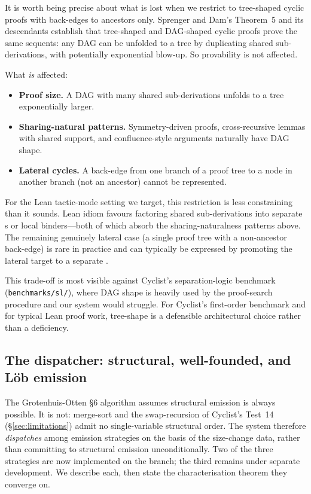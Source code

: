 It is worth being precise about what is lost when we restrict to
tree-shaped cyclic proofs with back-edges to ancestors only. Sprenger and
Dam's Theorem~5 and its descendants establish that tree-shaped and
DAG-shaped cyclic proofs prove the same sequents: any DAG can be unfolded
to a tree by duplicating shared sub-derivations, with potentially
exponential blow-up. So provability is not affected.

What \emph{is} affected:

\begin{itemize}
  \item \textbf{Proof size.} A DAG with many shared sub-derivations
    unfolds to a tree exponentially larger.
  \item \textbf{Sharing-natural patterns.} Symmetry-driven proofs,
    cross-recursive lemmas with shared support, and confluence-style
    arguments naturally have DAG shape.
  \item \textbf{Lateral cycles.} A back-edge from one branch of a
    proof tree to a node in another branch (not an ancestor) cannot be
    represented.
\end{itemize}

For the Lean tactic-mode setting we target, this restriction is less
constraining than it sounds. Lean idiom favours factoring shared
sub-derivations into separate s or local 
binders---both of which absorb the sharing-naturalness patterns above. The
remaining genuinely lateral case (a single proof tree with a non-ancestor
back-edge) is rare in practice and can typically be expressed by promoting
the lateral target to a separate .

This trade-off is most visible against Cyclist's separation-logic
benchmark (\texttt{benchmarks/sl/}), where DAG shape is heavily used by the
proof-search procedure and our system would struggle. For Cyclist's
first-order benchmark and for typical Lean proof work, tree-shape is a
defensible architectural choice rather than a deficiency.

\subsection{The dispatcher: structural, well-founded, and Löb emission}
\label{sec:dispatch}

The Grotenhuis-Otten §6 algorithm assumes structural emission is always
possible. It is not: merge-sort and the swap-recursion of Cyclist's
Test~14 (§\ref{sec:limitations}) admit no single-variable structural
order. The system therefore \emph{dispatches} among emission strategies on
the basis of the size-change data, rather than committing to structural
emission unconditionally. Two of the three strategies are now implemented
on the  branch; the third remains under separate development. We
describe each, then state the characterisation theorem they converge on.

